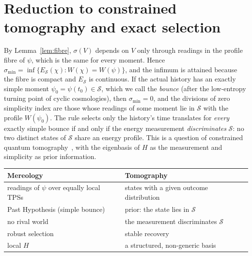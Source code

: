 \documentclass[11pt]{article}
\theoremstyle{definition}
\theoremstyle{remark}
\begin{document}
\section{Reduction to constrained tomography and exact selection}
\label{sec:reduction}

By Lemma~\ref{lem:fibre}, $\sigma(V)$ depends on $V$ only through readings in the profile fibre of $\psi$, which is the same for every moment. Hence $\sigma_{\min}=\inf\{E_{\mathcal S}(\chi):W(\chi)=W(\psi)\}$, and the infimum is attained because the fibre is compact and $E_{\mathcal S}$ is continuous. If the actual history has an exactly simple moment $\psi_0=\psi(t_0)\in\mathcal S$, which we call the \emph{bounce} (after the low-entropy turning point of cyclic cosmologies), then $\sigma_{\min}=0$, and the divisions of zero simplicity index are those whose readings of some moment lie in $\mathcal S$ with the profile $W(\psi_0)$. The rule selects only the history's time translates for \emph{every} exactly simple bounce if and only if the energy measurement \emph{discriminates} $\mathcal S$: no two distinct states of $\mathcal S$ share an energy profile. This is a question of constrained quantum tomography~\cite{HMW2013,KechWolf2017}, with the eigenbasis of $H$ as the measurement and simplicity as prior information.

\begin{center}
\begin{tabular}{ll}
\toprule
Mereology & Tomography \\
\midrule
readings of $\psi$ over equally local TPSs & states with a given outcome distribution \\
Past Hypothesis (simple bounce) & prior: the state lies in $\mathcal S$ \\
no rival world & the measurement discriminates $\mathcal S$ \\
robust selection & stable recovery \\
local $H$ & a structured, non-generic basis \\
\bottomrule
\end{tabular}
\end{center}
\end{document}

